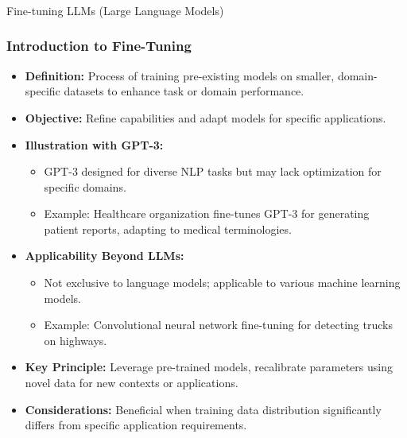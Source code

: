 \begin{frame}[fragile]\frametitle{}
\begin{center}
{\Large Fine-tuning LLMs (Large Language Models)}
\end{center}
\end{frame}

\begin{frame}[fragile]\frametitle{Introduction to Fine-Tuning}
  \begin{itemize}
    \item \textbf{Definition:} Process of training pre-existing models on smaller, domain-specific datasets to enhance task or domain performance.
    \item \textbf{Objective:} Refine capabilities and adapt models for specific applications.
    \item \textbf{Illustration with GPT-3:}
      \begin{itemize}
        \item GPT-3 designed for diverse NLP tasks but may lack optimization for specific domains.
        \item Example: Healthcare organization fine-tunes GPT-3 for generating patient reports, adapting to medical terminologies.
      \end{itemize}
    \item \textbf{Applicability Beyond LLMs:}
      \begin{itemize}
        \item Not exclusive to language models; applicable to various machine learning models.
        \item Example: Convolutional neural network fine-tuning for detecting trucks on highways.
      \end{itemize}
    \item \textbf{Key Principle:} Leverage pre-trained models, recalibrate parameters using novel data for new contexts or applications.
    \item \textbf{Considerations:} Beneficial when training data distribution significantly differs from specific application requirements.
  \end{itemize}
\end{frame}


